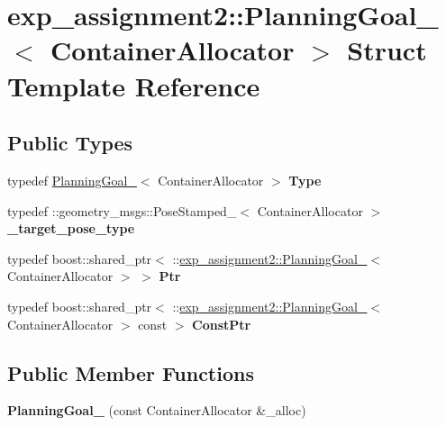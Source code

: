 \hypertarget{structexp__assignment2_1_1PlanningGoal__}{}\section{exp\+\_\+assignment2\+:\+:Planning\+Goal\+\_\+$<$ Container\+Allocator $>$ Struct Template Reference}
\label{structexp__assignment2_1_1PlanningGoal__}
\subsection*{Public Types}
\begin{DoxyCompactItemize}
\item 
\mbox{\label{structexp__assignment2_1_1PlanningGoal___ae011bedd1bcb1e6255f5d702dcddf7ac}} 
typedef \hyperlink{structexp__assignment2_1_1PlanningGoal__}{Planning\+Goal\+\_\+}$<$ Container\+Allocator $>$ {\bfseries Type}
\item 
\mbox{\label{structexp__assignment2_1_1PlanningGoal___a5370d17e6886587367c4222ae5c9471a}} 
typedef \+::geometry\+\_\+msgs\+::\+Pose\+Stamped\+\_\+$<$ Container\+Allocator $>$ {\bfseries \+\_\+target\+\_\+pose\+\_\+type}
\item 
\mbox{\label{structexp__assignment2_1_1PlanningGoal___a045850b1750613f2a9a31eab9e4cfaa3}} 
typedef boost\+::shared\+\_\+ptr$<$ \+::\hyperlink{structexp__assignment2_1_1PlanningGoal__}{exp\+\_\+assignment2\+::\+Planning\+Goal\+\_\+}$<$ Container\+Allocator $>$ $>$ {\bfseries Ptr}
\item 
\mbox{\label{structexp__assignment2_1_1PlanningGoal___af67b2426ddbce6d2fc5e35afa6f94761}} 
typedef boost\+::shared\+\_\+ptr$<$ \+::\hyperlink{structexp__assignment2_1_1PlanningGoal__}{exp\+\_\+assignment2\+::\+Planning\+Goal\+\_\+}$<$ Container\+Allocator $>$ const  $>$ {\bfseries Const\+Ptr}
\end{DoxyCompactItemize}
\subsection*{Public Member Functions}
\begin{DoxyCompactItemize}
\item 
\mbox{\label{structexp__assignment2_1_1PlanningGoal___ab8a98941f3b103fa192bebabc4fc4092}} 
{\bfseries Planning\+Goal\+\_\+} (const Container\+Allocator \&\+\_\+alloc)
\end{DoxyCompactItemize}
